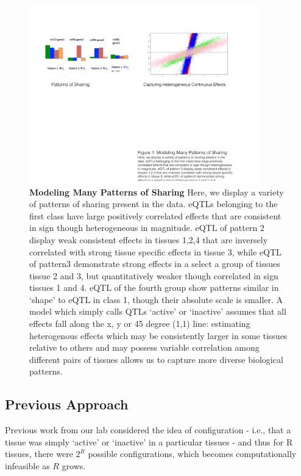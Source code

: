 \newline
\begin{figure}[htbp]
\includegraphics[width=10cm]{Figures/Patterns.pdf}
\caption{\textbf{Modeling Many Patterns of Sharing} Here, we display a variety of patterns of sharing present in the data. eQTLs belonging to the first class have large positively correlated effects that are consistent in sign though heterogeneous in magnitude. eQTL of pattern 2 display weak consistent effects in tissues 1,2,4 that are inversely correlated with strong tissue specific effects in tissue 3, while eQTL of pattern3 demonstrate strong effects in a select a group of tissues tissue 2 and 3, but quantitatively weaker though correlated in sign tissues 1 and 4. eQTL of the fourth group show patterns similar in `shape' to eQTL in class 1, though their absolute scale is smaller. A model which simply calls QTLs `active' or `inactive' assumes that all effects fall along the x, y or 45 degree (1,1) line: estimating heterogenous effects which may be consistently larger in some tissues relative to others and may possess variable correlation among different pairs of tissues allows us to capture more diverse biological patterns.}
\label{fig:Patterns}
\end{figure}
\newline


\subsection{Previous Approach}
 
Previous work from our lab considered the idea of configuration - i.e., that a tissue was simply `active' or `inactive' in a particular tissues - and thus for R tissues, there were $2^{R}$ possible configurations, which becomes computationally infeasible as $R$ grows.

